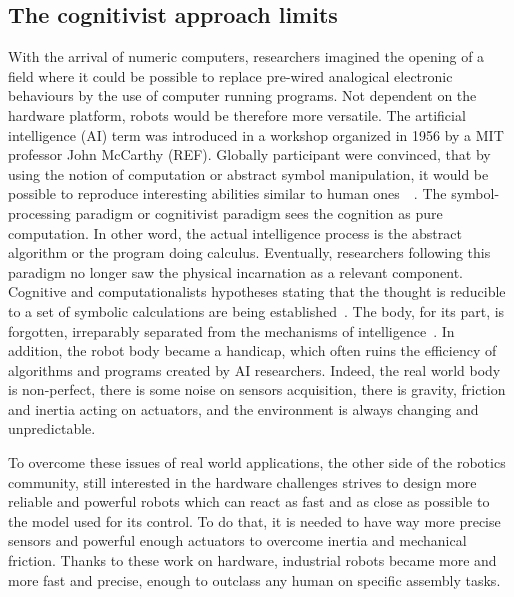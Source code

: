 \subsection{The cognitivist approach limits} %


With the arrival of numeric computers, researchers imagined the opening of a field where it could be possible to replace pre-wired analogical electronic behaviours by the use of computer running programs. Not dependent on the hardware platform, robots would be therefore more versatile.
The artificial intelligence (AI) term was introduced in a workshop organized in 1956 by a MIT professor John McCarthy (REF). Globally participant were convinced, that by using the notion of computation or abstract symbol manipulation, it would be possible to reproduce interesting abilities similar to human ones~\cite{kaufmann1979machines}~\cite{haugeland1989artificial}. The symbol-processing paradigm or cognitivist paradigm sees the cognition as pure computation. In other word, the actual intelligence process is the abstract algorithm or the program doing calculus. Eventually, researchers following this paradigm no longer saw the physical incarnation as a relevant component. Cognitive and computationalists hypotheses stating that the thought is reducible to a set of symbolic calculations are being established~\cite{fodor1987psychosemantics}. The body, for its part, is forgotten, irreparably separated from the mechanisms of intelligence~\cite{kaplan2008corps}.
In addition, the robot body became a handicap, which often ruins the efficiency of algorithms and programs created by AI researchers. Indeed, the real world body is non-perfect, there is some noise on sensors acquisition, there is gravity, friction and inertia acting on actuators, and the environment is always changing and unpredictable.

To overcome these issues of real world applications, the other side of the robotics community, still interested in the hardware challenges strives to design more reliable and powerful robots which can react as fast and as close as possible to the model used for its control. To do that, it is needed to have way more precise sensors and powerful enough actuators to overcome inertia and mechanical friction. Thanks to these work on hardware, industrial robots became more and more fast and precise, enough to outclass any human on specific assembly tasks.

